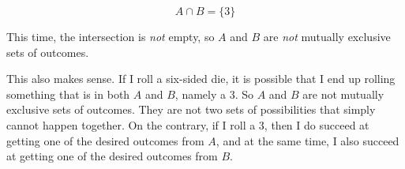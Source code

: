 \documentclass[../../../main.tex]{subfiles}
\begin{document}
\begin{equation*}
  A \cap B = \{ 3 \}
\end{equation*}

\noindent
This time, the intersection is \emph{not} empty, so $A$ and $B$ are \emph{not} mutually exclusive sets of outcomes. 

This also makes sense. If I roll a six-sided die, it is possible that I end up rolling something that is in both $A$ and $B$, namely a 3. So $A$ and $B$ are not mutually exclusive sets of outcomes. They are not two sets of possibilities that simply cannot happen together. On the contrary, if I roll a 3, then I do succeed at getting one of the desired outcomes from $A$, and at the same time, I also succeed at getting one of the desired outcomes from $B$.
\end{document}
